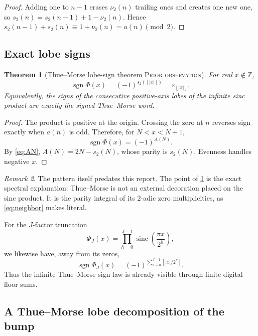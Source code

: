 \documentclass[11pt,oneside]{article}
\numberwithin{equation}{section}
\newtheorem{theorem}{Theorem}[section]
\theoremstyle{definition}
\theoremstyle{remark}
\newtheorem{remark}[theorem]{Remark}
\newcommand{\Z}{\mathbb Z}
\newcommand{\sinc}{\operatorname{sinc}}
\newcommand{\sgn}{\operatorname{sgn}}
\newcommand{\floor}[1]{\left\lfloor #1\right\rfloor}
\newcommand{\Observed}{\textsc{Prior observation}}
\begin{document}
\begin{proof}
Adding one to $n-1$ erases $\nu_2(n)$ trailing ones and creates one new one, so
$s_2(n)=s_2(n-1)+1-\nu_2(n)$.  Hence
$s_2(n-1)+s_2(n)\equiv1+\nu_2(n)=a(n)\pmod2$.
\end{proof}

\subsection{Exact lobe signs}

\begin{theorem}[Thue--Morse lobe-sign theorem \Observed]
\label{thm:lobe-sign}
For real $x\notin\Z$,
\begin{equation}
 \sgn\Phi(x)=(-1)^{s_2(\floor{|x|})}
             =\varepsilon_{\floor{|x|}}.                  \label{eq:lobe-sign}
\end{equation}
Equivalently, the signs of the consecutive positive-axis lobes of the infinite
sinc product are exactly the signed Thue--Morse word.
\end{theorem}

\begin{proof}
The product is positive at the origin.  Crossing the zero at $n$ reverses sign
exactly when $a(n)$ is odd.  Therefore, for $N<x<N+1$,
\[
 \sgn\Phi(x)=(-1)^{A(N)}.
\]
By \eqref{eq:AN}, $A(N)=2N-s_2(N)$, whose parity is $s_2(N)$.  Evenness handles
negative $x$.
\end{proof}

\begin{remark}
The pattern itself predates this report.  The point of
\cref{thm:lobe-sign} is the exact spectral explanation: Thue--Morse is not an
external decoration placed on the sinc product.  It is the parity integral of
its $2$-adic zero multiplicities, as \eqref{eq:neighbor} makes literal.
\end{remark}

For the $J$-factor truncation
\begin{equation}
 \Phi_J(x)=\prod_{h=0}^{J-1}\sinc\!\left(\frac{\pi x}{2^h}\right),             \label{eq:PhiJ}
\end{equation}
we likewise have, away from its zeros,
\begin{equation}
 \sgn\Phi_J(x)=(-1)^{\sum_{h=0}^{J-1}\floor{|x|/2^h}}.     \label{eq:finite-sign}
\end{equation}
Thus the infinite Thue--Morse sign law is already visible through finite digital
floor sums.

\subsection{A Thue--Morse lobe decomposition of the bump}
\end{document}
